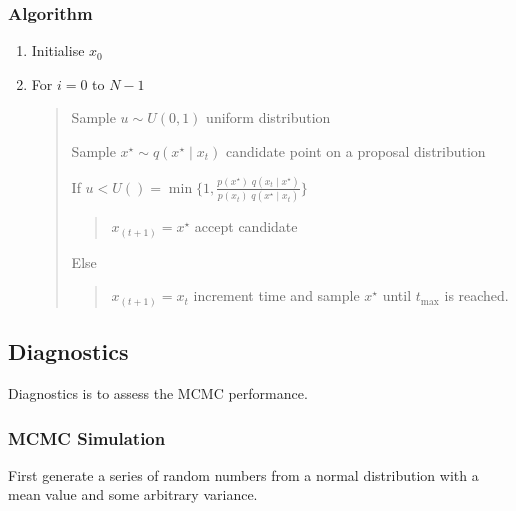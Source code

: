 \documentclass[a4paper,12pt,english]{sphinxhowto}
\begin{document}
\subsubsection{Algorithm}
\label{\detokenize{MCMC:algorithm}}\begin{enumerate}
%
\item {} 
Initialise \(x_0\)

\item {} 
For \(i=0\) to \(N-1\)
\begin{quote}

Sample \(u \sim U(0, 1)\)  uniform distribution

Sample \(x^\star \sim q(x^\star \mid x_t)\)  candidate point on a proposal distribution

If \(u < U() = \min\{1, \frac{p(x^\star) \; q(x_t \mid x^\star)}{p(x_t) \; q(x^\star \mid x_t)}\}\)
\begin{quote}

\(x_{(t+1)} = x^\star\)  accept candidate
\end{quote}

Else
\begin{quote}

\(x_{(t+1)} = x_t\)  increment time and sample \(x^\star\) until \(t_{\max}\) is reached.
\end{quote}
\end{quote}

\end{enumerate}



\subsection{Diagnostics}
\label{\detokenize{MCMC:diagnostics}}
Diagnostics is to assess the MCMC performance.



\subsubsection{MCMC Simulation}
\label{\detokenize{MCMC:mcmc-simulation}}
First generate a series of random numbers from a normal distribution with a mean value and some arbitrary variance.
\end{document}

